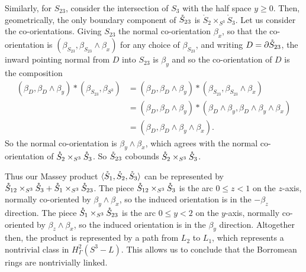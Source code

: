 Similarly, for $S_{23}$, consider the intersection of $S_3$ with the half space $y \geq 0$.
Then, geometrically, the only boundary component of $\mathring{S}_{23}$ is $\mathring S_2 \times_{S^3} \mathring S_3$.
Let us consider the co-orientations.
Giving $S_{23}$ the normal co-orientation $\beta_x$, so that the co-orientation is $(\beta_{S_{23}}, \beta_{S_{23}} \wedge \beta_x)$ for any choice of $\beta_{S_{23}}$, and writing $D = \partial \mathring{S}_{23}$, the inward pointing normal from $D$ into $S_{23}$ is $\beta_y$ and so the co-orientation of $D$ is the composition
\begin{align*}
(\beta_D, \beta_D \wedge \beta_y) * (\beta_{S_{23}}, \beta_{S^3}) &=(\beta_D, \beta_D \wedge \beta_y) * (\beta_{S_{23}}, \beta_{S_{23}} \wedge \beta_x)\\
&=(\beta_D, \beta_D \wedge \beta_y) * (\beta_D \wedge \beta_y, \beta_D \wedge \beta_y \wedge \beta_x)\\
&=(\beta_D,  \beta_D \wedge \beta_y \wedge \beta_x).
\end{align*}
So the normal co-orientation is $\beta_y \wedge \beta_x$, which agrees with the normal co-orientation of $\mathring{S}_2 \times_{S^3} \mathring{S}_3$.
So $\mathring{S}_{23}$ cobounds $\mathring{S}_2 \times_{S^3} \mathring{S}_3$.

Thus our Massey product $\langle \mathring{S}_1, \mathring{S}_2, \mathring{S}_3 \rangle$ can be represented by $\mathring{S}_{12} \times_{S^3} \mathring{S}_3 + \mathring{S}_1 \times_{S^3} \mathring{S}_{23}$.
The piece $\mathring{S}_{12} \times_{S^3} \mathring{S}_3$ is the arc $0 \leq z < 1$ on the $z$-axis, normally co-oriented by $\beta_y \wedge \beta_x$, so the induced orientation is in the $-\beta_z$ direction.
The piece $\mathring{S}_1 \times_{S^3} \mathring{S}_{23}$ is the arc $0 \leq y < 2$ on the $y$-axis, normally co-oriented by $\beta_z \wedge \beta_x$, so the induced orientation is in the $\beta_y$ direction.
Altogether then, the product is represented by a path from $L_2$ to $L_1$, which represents a nontrivial class in $H^2_\Gamma(S^3-L)$.
This allows us to conclude that the Borromean rings are nontrivially linked.







